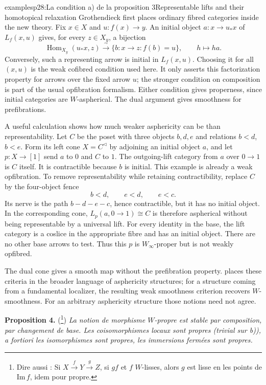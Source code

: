 \begin{dcomment}{examples}{p28:La condition a) de la proposition 3}{Representable lifts and their homotopical relaxation}
Grothendieck first places ordinary fibred categories inside the new theory. Fix $x\in X$ and $u:f(x)\to y$. An initial object $a:x\to u_*x$ of $L_f(x,u)$ gives, for every $z\in X_y$, a bijection
\[
 \operatorname{Hom}_{X_y}(u_*x,z)
 \xrightarrow{\ \sim\ }
 \{b:x\to z:f(b)=u\},\qquad h\longmapsto ha.
\]
Conversely, such a representing arrow is initial in $L_f(x,u)$. Choosing it for all $(x,u)$ is the weak cofibred condition used here. It only asserts this factorization property for arrows over the fixed arrow $u$; the stronger condition on composition is part of the usual opfibration formalism. Either condition gives properness, since initial categories are $W$-aspherical. The dual argument gives smoothness for prefibrations.

A useful calculation shows how much weaker asphericity can be than representability. Let $C$ be the poset with three objects $b,d,e$ and relations $b<d$, $b<e$. Form its left cone $X=C^{\lhd}$ by adjoining an initial object $a$, and let $p:X\to[1]$ send $a$ to $0$ and $C$ to $1$. The outgoing-lift category from $a$ over $0\to1$ is $C$ itself. It is contractible because $b$ is initial. This example is already a weak opfibration. To remove representability while retaining contractibility, replace $C$ by the four-object fence
\[
 b<d,\qquad e<d,\qquad e<c.
\]
Its nerve is the path $b-d-e-c$, hence contractible, but it has no initial object. In the corresponding cone, $L_p(a,0\to1)\cong C$ is therefore aspherical without being representable by a universal lift. For every identity in the base, the lift category is a coslice in the appropriate fibre and has an initial object. There are no other base arrows to test. Thus this $p$ is $W_\infty$-proper but is not weakly opfibred.

The dual cone gives a smooth map without the prefibration property. \citet[Proposition 4.3 and Example 4.17]{Maltsiniotis2005Asphericite} places these criteria in the broader language of asphericity structures; for a structure coming from a fundamental localizer, the resulting weak smoothness criterion recovers $W$-smoothness. For an arbitrary asphericity structure those notions need not agree.
\end{dcomment}


\textbf{Proposition 4.} (\footnote[43]{Dire aussi : Si $X \xrightarrow{f} Y \xrightarrow{g} Z$, si $gf$ et $f$ $W$-lisses, alors $g$ est lisse en les points de $\mathrm{Im}\, f$, idem pour propre.}) \textit{La notion de morphisme $W$-propre est stable par composition, par changement de base. Les coisomorphismes locaux sont propres (trivial sur b)), a fortiori les isomorphismes sont propres, les immersions fermées sont propres.}

